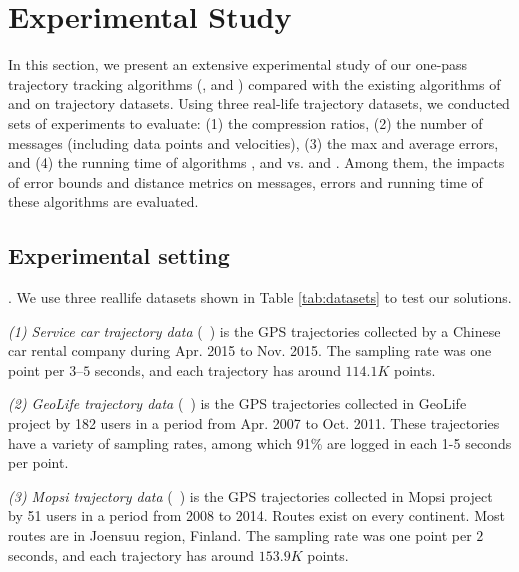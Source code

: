 \section{Experimental Study}
\label{sec-exp}



In this section, we present an extensive experimental study of our one-pass trajectory tracking algorithms (\citt, \sitt and \bitt) compared with the
existing algorithms of \ldrh and \grts on trajectory datasets. Using three real-life trajectory datasets, we conducted sets of experiments to evaluate:
(1) the compression ratios,
(2) the number of messages (including data points and velocities),
(3) the max and average errors, and
(4) the running time of algorithms \citt, \sitt and \bitt vs. \ldrh and \grts. 
Among them, the impacts of error bounds and distance metrics on messages, errors and running time of these algorithms are evaluated. 


\subsection{Experimental setting}

. We use three reallife datasets shown in Table \ref{tab:datasets} to test our solutions.

\vspace{0.5ex}
\ni \emph{(1) Service car trajectory data} (\sercar~\cite{Lin:Cised}) is the GPS trajectories collected by a Chinese car rental company during Apr. 2015 to Nov. 2015. The sampling rate was one point per $3$--$5$ seconds, and
each trajectory has around $114.1K$ points.

\vspace{0.5ex}
\ni \emph{(2) GeoLife trajectory data} (\geolife~\cite{Web:GeoLife}) is the GPS trajectories collected in GeoLife project by 182 users in a period from Apr. 2007 to Oct. 2011. These trajectories have a variety of sampling rates, among which 91\% are logged in each 1-5 seconds per point. %

\vspace{0.5ex}
\ni \emph{(3) Mopsi trajectory data} (\mopsi~\cite{Web:Mopsi}) is the GPS trajectories collected in Mopsi project by 51 users in a period from 2008 to 2014. Routes exist on every continent. Most routes are in Joensuu region, Finland.
The sampling rate was one point per $2$ seconds, and each trajectory has around $153.9K$ points.

